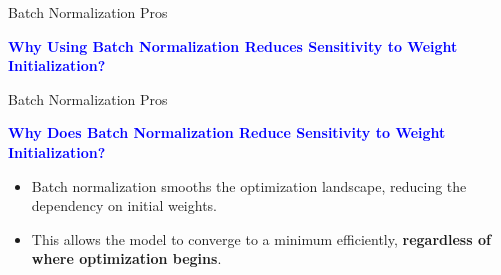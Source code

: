 \documentclass[serif, aspectratio=169]{beamer}
\begin{document}
\begin{frame}{Batch Normalization Pros}

    \textcolor{blue}{\textbf{Why Using Batch Normalization Reduces Sensitivity to Weight Initialization?}}

    \begin{figure}[h]
        \centering
    \end{figure}

    \vfill
    
\end{frame}

\begin{frame}{Batch Normalization Pros}

    \textcolor{blue}{\textbf{Why Does Batch Normalization Reduce Sensitivity to Weight Initialization?}}
    \begin{itemize}
        \item Batch normalization smooths the optimization landscape, reducing the dependency on initial weights. 
        \item This allows the model to converge to a minimum efficiently, \textbf{regardless of where optimization begins}.
        


    \end{itemize}
\end{frame}
\end{document}
